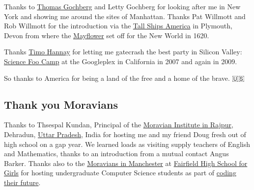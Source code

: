 \documentclass[
]{book}
\begin{document}
Thanks to \href{https://wi.mit.edu/news/memoriam-thomas-gochberg}{Thomas Gochberg} and Letty Gochberg for looking after me in New York and showing me around the sites of Manhattan. Thanks Pat Willmott and Rob Willmott for the introduction via the \href{https://www.tallshipsamerica.org/}{Tall Ships America} in Plymouth, Devon from where the \href{https://en.wikipedia.org/wiki/Mayflower}{Mayflower} set off for the New World in 1620.

Thanks \href{https://en.wikipedia.org/wiki/Timo_Hannay}{Timo Hannay} for letting me gatecrash the best party in Silicon Valley: \href{https://en.wikipedia.org/wiki/Science_Foo_Camp}{Science Foo Camp} at the Googleplex in California in 2007 and again in 2009.

So thanks to America for being a land of the free and a home of the brave. 🇺🇸🙏

\hypertarget{moravians}{%
\subsection{Thank you Moravians}\label{moravians}}

Thanks to Thsespal Kundan, Principal of the \href{https://moravianinstitute.com/}{Moravian Institute in Rajpur}, Dehradun, \href{https://en.wikipedia.org/wiki/Uttar_Pradesh}{Uttar Pradesh}, India for hosting me and my friend Doug fresh out of high school on a gap year. We learned loads as visiting supply teachers of English and Mathematics, thanks to an introduction from a mutual contact Angus Barker. Thanks also to the \href{https://en.wikipedia.org/wiki/Fairfield_Moravian_Church}{Moravians in Manchester} at \href{https://en.wikipedia.org/wiki/Fairfield_High_School_for_Girls}{Fairfield High School for Girls} for hosting undergraduate Computer Science students as part of \href{http://www.cs.man.ac.uk/~hulld/coding-their-future.html}{coding their future}.
\end{document}
